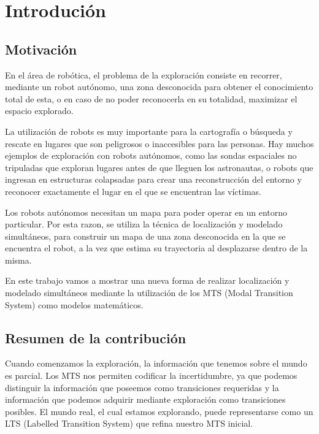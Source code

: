 \chapter{Introdución}

\section{Motivación}

En el área de robótica, el problema de la exploración consiste en recorrer, mediante un robot autónomo, una zona
desconocida para obtener el conocimiento total de esta, o en caso de no poder reconocerla en su totalidad, maximizar
el espacio explorado. 

\vspace{\baselineskip}
La utilización de robots es muy importante para la cartografía o búsqueda y rescate en lugares que son peligrosos o 
inaccesibles para las personas. Hay muchos ejemplos de exploración con robots autónomos, como las sondas espaciales
no tripuladas que exploran lugares antes de que lleguen los astronautas, o robots que ingresan en estructuras colapsadas 
para crear una reconstrucción del entorno y reconocer exactamente el lugar en el que se encuentran las víctimas.

\vspace{\baselineskip}
Los robots autónomos necesitan un mapa para poder operar en un entorno particular. Por esta razon, se utiliza la técnica
de localización y modelado simultáneos, para construir un mapa de una zona desconocida en la que se encuentra el robot,
a la vez que estima su trayectoria al desplazarse dentro de la misma.

\vspace{\baselineskip}
En este trabajo vamos a mostrar una nueva forma de realizar localización y modelado simultáneos mediante la utilización
de los MTS (Modal Transition System) como modelos matemáticos.

\section{Resumen de la contribución}

Cuando comenzamos la exploración, la información que tenemos sobre el mundo es parcial. Los MTS nos permiten codificar 
la incertidumbre, ya que podemos distinguir la información que poseemos como transiciones requeridas y la información 
que podemos adquirir mediante exploración como transiciones posibles. El mundo real, el cual estamos explorando, puede 
representarse como un LTS (Labelled Transition System) que refina nuestro MTS inicial.

